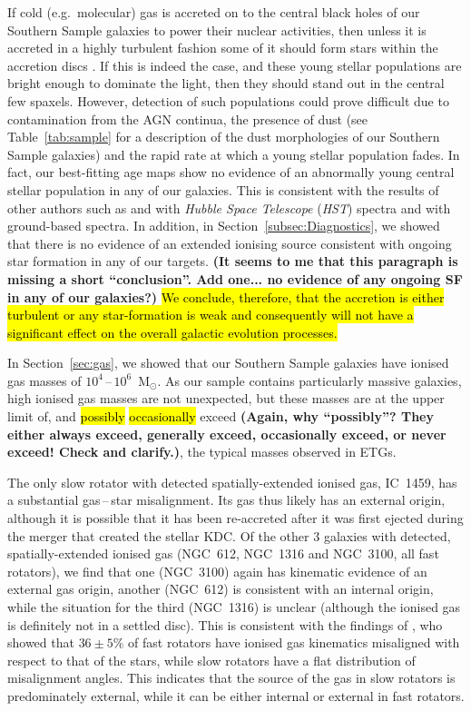 \documentclass[a4paper,fleqn,usenatbib]{mnras}
\DeclareRobustCommand{\removed}[1]{{\sethlcolor{red}\hl{#1}}}
\DeclareRobustCommand{\added}[1]{{\sethlcolor{green}\hl{#1}}}
\begin{document}
If cold (e.g.\ molecular) gas is accreted on to the central black
holes of our Southern Sample galaxies to power their nuclear
activities, then unless it is accreted in a highly turbulent fashion
some of it should form stars within the accretion discs
\citep[e.g.][]{Collin1999, Diamond-Stanic2012, LaMassa2013}. If this
is indeed the case, and these young stellar populations are bright
enough to dominate the light, then they should stand out in the
central few spaxels. However, detection of such populations could
prove difficult due to contamination from the AGN continua, the
presence of dust (see Table~\ref{tab:sample} for a description of the
dust morphologies of our Southern Sample galaxies) and the rapid rate
at which a young stellar population fades. In fact, our best-fitting
age maps show no evidence of an abnormally young central stellar
population in any of our galaxies. This is consistent with the results
of other authors such as \citet{GonzalezDelgado2004} and
\citet{Sarzi2005b} with \textit{Hubble Space Telescope} (\textit{HST})
spectra and \citet{CidFernandes2004} with ground-based spectra. In
addition, in Section~\ref{subsec:Diagnostics}, we showed that there is
no evidence of an extended ionising source consistent with ongoing
star formation in any of our targets. {\bf (It seems to me that this
paragraph is missing a short ``conclusion''. Add one... no evidence
of any ongoing SF in any of our galaxies?)} \added{We conclude, therefore,
that the accretion is either turbulent or any star-formation is weak
and consequently will not have a significant effect on the overall galactic
evolution processes.}

In Section~\ref{sec:gas}, we showed that our Southern Sample galaxies
have ionised gas masses of $10^4$\,--\,$10^6$~$\mathrm{M_\odot}$. As
our sample contains particularly massive galaxies, high ionised gas
masses are not unexpected, but these masses are at the upper limit of,
and \removed{possibly} \added{occasionally} exceed {\bf (Again, why ``possibly''? They either always
  exceed, generally exceed, occasionally exceed, or never exceed!
  Check and clarify.)}, the typical masses observed in ETGs.

The only slow rotator with detected spatially-extended ionised gas,
IC~1459, has a substantial gas\,--\,star misalignment. Its gas thus
likely has an external origin, although it is possible that it has
been re-accreted after it was first ejected during the merger that
created the stellar KDC. Of the other $3$ galaxies with detected,
spatially-extended ionised gas (NGC~612, NGC~1316 and NGC~3100, all
fast rotators), we find that one (NGC~3100) again has kinematic
evidence of an external gas origin, another (NGC~612) is consistent
with an internal origin, while the situation for the third (NGC~1316)
is unclear (although the ionised gas is definitely not in a settled
disc). This is consistent with the findings of \citet{Davis2011a}, who
showed that $36\pm5\%$ of fast rotators have ionised gas kinematics
misaligned with respect to that of the stars, while slow rotators have
a flat distribution of misalignment angles. This indicates that the
source of the gas in slow rotators is predominately external, while it
can be either internal or external in fast rotators.
\end{document}
